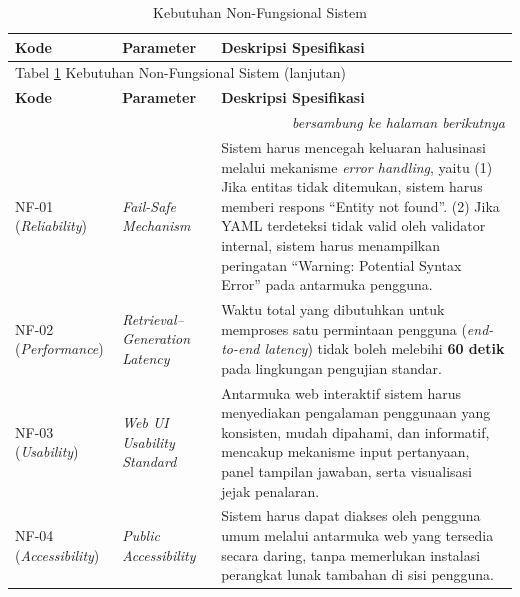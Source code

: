 \captionsetup[longtable]{justification=raggedright,singlelinecheck=false}

\begin{longtable}{ | p{} | p{} | p{} |}
\caption{Kebutuhan Non-Fungsional Sistem}
\label{tbl:nonfungsional} \\
\hline
\multicolumn{1}{|p{0.1\textwidth}|}{\textbf{Kode}} & \multicolumn{1}{p{0.30\textwidth}|}{\textbf{Parameter}} & \multicolumn{1}{p{0.50\textwidth}|}{\textbf{Deskripsi Spesifikasi}} \\
\hline
\endfirsthead

\multicolumn{3}{l}{Tabel \ref{tbl:nonfungsional} Kebutuhan Non-Fungsional Sistem (lanjutan)} \\
\hline
\multicolumn{1}{|p{0.1\textwidth}|}{\textbf{Kode}} & \multicolumn{1}{p{0.30\textwidth}|}{\textbf{Parameter}} & \multicolumn{1}{p{0.50\textwidth}|}{\textbf{Deskripsi Spesifikasi}} \\
\hline
\endhead

\hline
\multicolumn{3}{r}{\textit{bersambung ke halaman berikutnya}} \\
\endfoot

\hline
\endlastfoot

NF-01 (\textit{Reliability}) & \textit{Fail-Safe Mechanism} &
Sistem harus mencegah keluaran halusinasi melalui mekanisme \textit{error handling}, yaitu (1) Jika entitas tidak ditemukan, sistem harus memberi respons ``Entity not found''. (2) Jika YAML terdeteksi tidak valid oleh validator internal, sistem harus menampilkan peringatan ``Warning: Potential Syntax Error'' pada antarmuka pengguna. \\
\hline
 
NF-02 (\textit{Performance}) & \textit{Retrieval--Generation Latency} & Waktu total yang dibutuhkan untuk memproses satu permintaan pengguna (\textit{end-to-end latency}) tidak boleh melebihi \textbf{60 detik} pada lingkungan pengujian standar. \\
\hline

NF-03 (\textit{Usability}) & \textit{Web UI Usability Standard} & Antarmuka web interaktif sistem harus menyediakan pengalaman penggunaan yang konsisten, mudah dipahami, dan informatif, mencakup mekanisme input pertanyaan, panel tampilan jawaban, serta visualisasi jejak penalaran. \\
\hline

NF-04 (\textit{Accessibility}) & \textit{Public Accessibility} &
Sistem harus dapat diakses oleh pengguna umum melalui antarmuka web yang tersedia secara daring, tanpa memerlukan instalasi perangkat lunak tambahan di sisi pengguna. \\ \hline

\end{longtable}